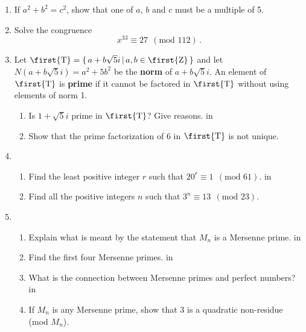\documentclass[12pt]{article}
\newcommand{\T}{\mbox{\first{T}}}
\newcommand{\Z}{\mbox{\first{Z}}}
\newcommand{\rmp}{\reversemarginpar\marginpar}
\begin{document}
\begin{enumerate}
\item If \rmp{[8]}  $a^2 + b^2 = c^2$, show that one of $a$, $b$ and $c$ must be
         a multiple of 5.

\newpage
\item
    Solve \rmp{[12]}the congruence
       $$
         x^{33} \equiv 27 \ \ (\textrm{mod\ } 112)\, .
       $$

\newpage
\item Let \rmp{[10]} $\T  = \{\, a+b\sqrt{5} i \,|\, a,b\in
         \Z\,\}$ and let $N(a+b\sqrt{5} i) = a^2 + 5b^2$ be the \textbf{norm} of
         $a+b\sqrt{5} i$. An element of  $\T$ is \textbf{prime} if it cannot be
         factored in $\T$ without using elements of norm 1.
    \begin{enumerate}
      \item  Is $1+\sqrt{5} i$ prime in $\T$? Give reasons.
 in
      \item  Show that the prime factorization of 6 in $\T$ is not unique.
    \end{enumerate}

\newpage
\item
    \begin{enumerate}
      \item  Find \rmp{[10]}the least positive integer $r$ such that
             $ 20^r \equiv 1 \ \ (\textrm{mod } 61)$.
 in
      \item  Find all the positive integers $n$ such that
             $ 3^n \equiv 13 \ \ (\textrm{mod } 23)$.
    \end{enumerate}

\newpage
\item
    \begin{enumerate}
      \item  Explain \rmp{[12]}what is meant by the statement that $M_n$ is a
Mersenne prime.
 in
      \item  Find the first four Mersenne primes.
 in
      \item  What is the connection between Mersenne primes and perfect numbers?
 in
      \item  If $M_n$ is any Mersenne prime, show that 3 is a quadratic non-residue (mod
$M_n$).
    \end{enumerate}


\end{enumerate}
\end{document}
